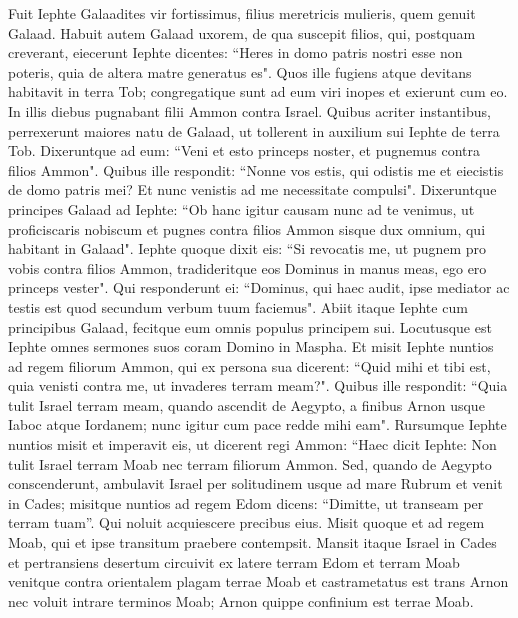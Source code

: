 \begin{biblechapter}  
\verse Fuit Iephte Galaadites vir fortissimus, filius meretricis mulieris, quem genuit Galaad. 
\verse Habuit autem Galaad uxorem, de qua suscepit filios, qui, postquam creverant, eiecerunt Iephte dicentes: “Heres in domo patris nostri esse non poteris, quia de altera matre generatus es". 
\verse Quos ille fugiens atque devitans habitavit in terra Tob; congregatique sunt ad eum viri inopes et exierunt cum eo. 
\verse In illis diebus pugnabant filii Ammon contra Israel. 
\verse Quibus acriter instantibus, perrexerunt maiores natu de Galaad, ut tollerent in auxilium sui Iephte de terra Tob. 
\verse Dixeruntque ad eum: “Veni et esto princeps noster, et pugnemus contra filios Ammon". 
\verse Quibus ille respondit: “Nonne vos estis, qui odistis me et eiecistis de domo patris mei? Et nunc venistis ad me necessitate compulsi". 
\verse Dixeruntque principes Galaad ad Iephte: “Ob hanc igitur causam nunc ad te venimus, ut proficiscaris nobiscum et pugnes contra filios Ammon sisque dux omnium, qui habitant in Galaad". 
\verse Iephte quoque dixit eis: “Si revocatis me, ut pugnem pro vobis contra filios Ammon, tradideritque eos Dominus in manus meas, ego ero princeps vester". 
\verse Qui responderunt ei: “Dominus, qui haec audit, ipse mediator ac testis est quod secundum verbum tuum faciemus". 
\verse Abiit itaque Iephte cum principibus Galaad, fecitque eum omnis populus principem sui. Locutusque est Iephte omnes sermones suos coram Domino in Maspha. 
\verse Et misit Iephte nuntios ad regem filiorum Ammon, qui ex persona sua dicerent: “Quid mihi et tibi est, quia venisti contra me, ut invaderes terram meam?". 
\verse Quibus ille respondit: “Quia tulit Israel terram meam, quando ascendit de Aegypto, a finibus Arnon usque Iaboc atque Iordanem; nunc igitur cum pace redde mihi eam". 
\verse Rursumque Iephte nuntios misit et imperavit eis, ut dicerent regi Ammon: 
\verse “Haec dicit Iephte: Non tulit Israel terram Moab nec terram filiorum Ammon. 
\verse Sed, quando de Aegypto conscenderunt, ambulavit Israel per solitudinem usque ad mare Rubrum et venit in Cades; 
\verse misitque nuntios ad regem Edom dicens: “Dimitte, ut transeam per terram tuam”. Qui noluit acquiescere precibus eius. Misit quoque et ad regem Moab, qui et ipse transitum praebere contempsit. Mansit itaque Israel in Cades 
\verse et pertransiens desertum circuivit ex latere terram Edom et terram Moab venitque contra orientalem plagam terrae Moab et castrametatus est trans Arnon nec voluit intrare terminos Moab; Arnon quippe confinium est terrae Moab. 

\end{biblechapter}

